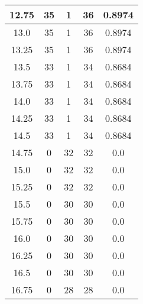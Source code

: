 \documentclass[letterpaper, 12pt]{article}
\begin{document}
\begin{longtable}{|c|c|c|c|c|}
\hline
12.75 & 35 & 1 & 36 & 0.8974 \\
\hline
13.0 & 35 & 1 & 36 & 0.8974 \\
\hline
13.25 & 35 & 1 & 36 & 0.8974 \\
\hline
13.5 & 33 & 1 & 34 & 0.8684 \\
\hline
13.75 & 33 & 1 & 34 & 0.8684 \\
\hline
14.0 & 33 & 1 & 34 & 0.8684 \\
\hline
14.25 & 33 & 1 & 34 & 0.8684 \\
\hline
14.5 & 33 & 1 & 34 & 0.8684 \\
\hline
14.75 & 0 & 32 & 32 & 0.0 \\
\hline
15.0 & 0 & 32 & 32 & 0.0 \\
\hline
15.25 & 0 & 32 & 32 & 0.0 \\
\hline
15.5 & 0 & 30 & 30 & 0.0 \\
\hline
15.75 & 0 & 30 & 30 & 0.0 \\
\hline
16.0 & 0 & 30 & 30 & 0.0 \\
\hline
16.25 & 0 & 30 & 30 & 0.0 \\
\hline
16.5 & 0 & 30 & 30 & 0.0 \\
\hline
16.75 & 0 & 28 & 28 & 0.0 \\
\hline
\end{longtable}
\end{document}
